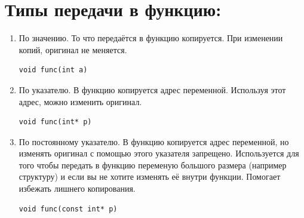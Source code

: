 \documentclass{article}
\begin{document}
\section*{Типы передачи в функцию:}
\begin{enumerate}
\item По значению. То что передаётся в функцию копируется. При изменении копий, оригинал не меняется.
\begin{lstlisting}
void func(int a)
\end{lstlisting}
\item По указателю. В функцию копируется адрес переменной. Используя этот адрес, можно изменить оригинал.
\begin{lstlisting}
void func(int* p)
\end{lstlisting}
\item По постоянному указателю. В функцию копируется адрес переменной, но изменять оригинал с помощью этого указателя запрещено. Используется для того чтобы передать в функцию переменую большого размера (например структуру) и если вы не хотите изменять её внутри функции. Помогает избежать лишнего копирования.
\begin{lstlisting}
void func(const int* p)
\end{lstlisting}
\end{enumerate}
\end{document}
